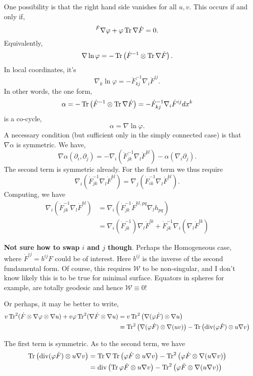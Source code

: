 \documentclass{amsart}
\begin{document}
One possibility is that the right hand side vanishes for all \(u, v\). This occurs if and only if,
\[
^{\dot{F}} \nabla \varphi + \varphi \operatorname{Tr} \nabla \dot{F} = 0.
\]
Equivalently,
\[
\nabla \ln \varphi = - \operatorname{Tr} \left(\dot{F}^{-1} \otimes \operatorname{Tr} \nabla \dot{F}\right).
\]
In local coordinates, it's
\[
\nabla_k \ln \varphi = -\dot{F}^{-1}_{kj} \nabla_i \dot{F}^{ij}.
\]
In other words, the one form,
\[
\alpha = - \operatorname{Tr} \left(\dot{F}^{-1} \otimes \operatorname{Tr} \nabla \dot{F}\right) = -\dot{F}^{-1}_{kj} \nabla_i \dot{F}^{ij} dx^k
\]
is a co-cycle,
\[
\alpha = \nabla \ln \varphi.
\]
A necessary condition (but sufficient only in the simply connected case) is that \(\nabla \alpha\) is symmetric. We have,
\[
\nabla \alpha (\partial_i, \partial_j) = - \nabla_i(\dot{F}^{-1}_{jk} \nabla_l \dot{F}^{kl}) - \alpha(\nabla_i \partial_j).
\]
The second term is symmetric already. For the first term we thus require
\[
\nabla_i(\dot{F}^{-1}_{jk} \nabla_l \dot{F}^{kl}) =  \nabla_j(\dot{F}^{-1}_{ik} \nabla_l \dot{F}^{kl}).
\]
Computing, we have
\begin{align*}
\nabla_i(\dot{F}^{-1}_{jk} \nabla_l \dot{F}^{kl}) &= \nabla_i(\dot{F}^{-1}_{jk} \dot{F}^{kl,pq} \nabla_l h_{pq}) \\
&= \nabla_i (\dot{F}^{-1}_{jk}) \nabla_l \dot{F}^{lk} + \dot{F}^{-1}_{jk} \nabla_i (\nabla_l \dot{F}^{lk})
\end{align*}


\textbf{Not sure how to swap \(i\) and \(j\) though}. Perhaps the Homogeneous case, where \(\dot{F}^{ij} = b^{ij} F\) could be of interest. Here \(b^{ij}\) is the inverse of the second fundamental form. Of course, this requires \(\mathcal{W}\) to be non-singular, and I don't know likely this is to be true for minimal surface. Equators in spheres for example, are totally geodesic and hence \(\mathcal{W} \equiv 0\)!

Or perhaps, it may be better to write,
\begin{align*}
v \operatorname{Tr}^2(\dot{F} \otimes \nabla \varphi \otimes \nabla u) + v \varphi \operatorname{Tr}^2(\nabla \dot{F} \otimes \nabla u) &= v \operatorname{Tr}^2 \left(\nabla (\varphi \dot{F}) \otimes \nabla u\right) \\
&= \operatorname{Tr}^2 \left(\nabla (\varphi \dot{F}) \otimes \nabla (uv)\right) - \operatorname{Tr} \left(\operatorname{div} (\varphi \dot{F}) \otimes u \nabla v\right)
\end{align*}

The first term is symmetric. As to the second term, we have
\begin{align*}
\operatorname{Tr} \left(\operatorname{div} (\varphi \dot{F}) \otimes u \nabla v\right) &= \operatorname{Tr} \nabla \operatorname{Tr} \left(\varphi \dot{F} \otimes u \nabla v\right) - \operatorname{Tr}^2\left(\varphi \dot{F} \otimes \nabla(u \nabla v)\right) \\
&= \operatorname{div} \left(\operatorname{Tr} \varphi\dot{F} \otimes u \nabla v\right) - \operatorname{Tr}^2\left(\varphi \dot{F} \otimes \nabla(u \nabla v)\right)
\end{align*}
\end{document}
